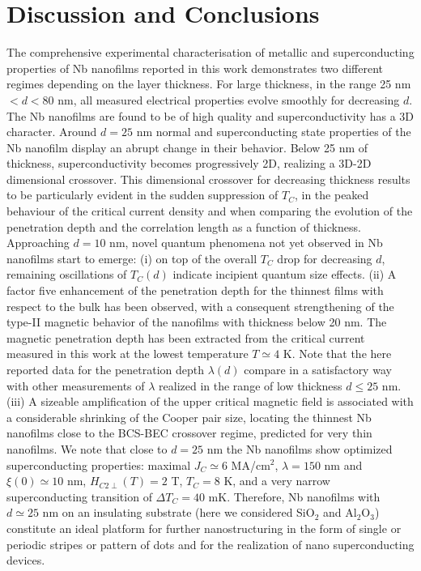 \documentclass[reprint,onecolumn,superscriptaddress,a4paper,nofootinbib,floatfix]{revtex4-1}
\begin{document}
\section*{Discussion and Conclusions}
The comprehensive experimental characterisation of metallic and superconducting properties of Nb nanofilms reported in this work demonstrates two different regimes depending on the layer thickness. For large thickness, in the range 25 nm $< d < 80$ nm, all measured electrical properties evolve smoothly for decreasing $d$. The Nb nanofilms are found to be of high quality and superconductivity has a 3D character. Around $d = 25$ nm normal and superconducting state properties of the Nb nanofilm display an abrupt change in their behavior. Below 25 nm of thickness, superconductivity becomes progressively 2D, realizing a 3D-2D dimensional crossover. 
This dimensional crossover for decreasing thickness results to be particularly evident in the sudden suppression of $T_C$, in the peaked behaviour of the critical current density and when comparing the evolution of the penetration depth and the correlation length as a function of thickness.
Approaching $d = 10$ nm, novel quantum phenomena not yet observed in Nb nanofilms start to emerge: (i) on top of the overall $T_C$ drop for decreasing $d$, remaining oscillations of $T_C(d)$ indicate incipient quantum size effects.  
(ii) A factor five enhancement of the penetration depth for the thinnest films with respect to the bulk has been observed, with a consequent strengthening of the type-II magnetic behavior of the nanofilms with thickness below 20 nm. The magnetic penetration depth has been extracted from the critical current measured in this work at the lowest temperature $T\simeq 4$ K.
Note that the here reported data for the penetration depth $\lambda(d)$ compare in a satisfactory way with other measurements of $\lambda$ realized in the range of low thickness $d \leq 25$ nm. 
(iii) A sizeable amplification of the upper critical magnetic field is associated with a considerable shrinking of the Cooper pair size, locating the thinnest Nb nanofilms close to the BCS-BEC crossover regime, predicted for very thin nanofilms.
We note that close to $d = 25$ nm the Nb nanofilms show optimized superconducting properties: maximal $J_C \simeq 6$ MA/cm$^2$, $\lambda = 150$ nm and $\xi(0)\simeq 10$ nm, $H_{C2\perp}(T) = 2$ T, $T_C = 8$ K, and a very narrow superconducting transition of $\Delta T_C = 40$ mK. Therefore, Nb nanofilms with $d\simeq 25$ nm on an insulating substrate (here we considered SiO$_2$ and Al$_2$O$_3$) constitute an ideal platform for further nanostructuring in the form of single or periodic stripes or pattern of dots and for the realization of nano superconducting devices.
\end{document}
